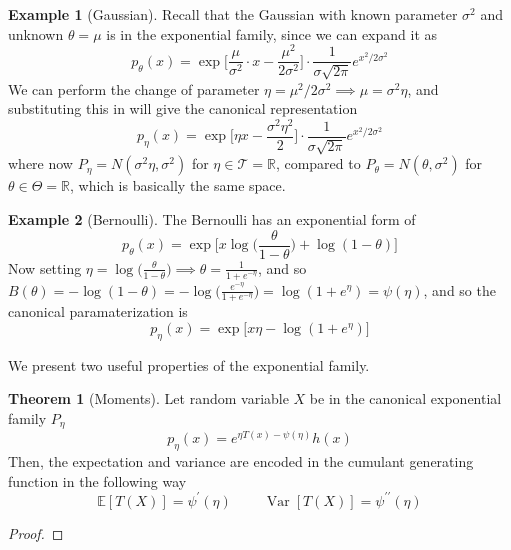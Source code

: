 \documentclass{article}
\DeclareMathOperator{\Var}{Var}
\theoremstyle{definition}
\newtheorem{theorem}{Theorem}[section]
\newtheorem{example}{Example}[section]
\begin{document}
  \begin{example}[Gaussian]
  Recall that the Gaussian with known parameter $\sigma^2$ and unknown $\theta = \mu$ is in the exponential family, since we can expand it as 
  \[p_\theta (x) = \exp \bigg[ \frac{\mu}{\sigma^2} \cdot x - \frac{\mu^2}{2 \sigma^2} \bigg] \cdot \frac{1}{\sigma \sqrt{2\pi}} e^{x^2/2 \sigma^2}\]
  We can perform the change of parameter $\eta = \mu^2 / 2\sigma^2 \implies \mu = \sigma^2 \eta$, and substituting this in will give the canonical representation 
  \[p_\eta (x) = \exp \Big[ \eta x - \frac{\sigma^2 \eta^2}{2} \Big] \cdot \frac{1}{\sigma \sqrt{2\pi}} e^{x^2/2 \sigma^2}\]
  where now $P_\eta = N(\sigma^2 \eta, \sigma^2)$ for $\eta \in \mathcal{T} = \mathbb{R}$, compared to $P_\theta = N(\theta, \sigma^2)$ for $\theta \in \Theta = \mathbb{R}$, which is basically the same space. 
  \end{example}

  \begin{example}[Bernoulli]
  The Bernoulli has an exponential form of 
  \[p_\theta (x) = \exp \bigg[ x \log \Big( \frac{\theta}{1 - \theta} \Big) + \log(1 - \theta)\bigg]\]
  Now setting $\eta = \log\big( \frac{\theta}{1 - \theta} \big) \implies \theta = \frac{1}{1 + e^{-\eta}}$, and so $B(\theta) = - \log(1 - \theta) = - \log \big( \frac{e^{-\eta}}{1 + e^{-\eta}} \big) = \log(1 + e^\eta) = \psi(\eta)$, and so the canonical paramaterization is 
  \[p_\eta (x) = \exp \big[ x \eta - \log(1 + e^{\eta}) \big]\]
  \end{example}


  We present two useful properties of the exponential family. 

  \begin{theorem}[Moments]
  Let random variable $X$ be in the canonical exponential family $P_\eta$ 
  \[p_\eta (x) = e^{\eta T(x) - \psi(\eta)} h(x)\]
  Then, the expectation and variance are encoded in the cumulant generating function in the following way 
  \[\mathbb{E} [T(X)] = \psi^\prime (\eta) \;\;\;\;\;\;\;\; \Var[T(X)] = \psi^{\prime\prime} (\eta)\]
  \end{theorem}
  \begin{proof}

  \end{proof}
\end{document}
